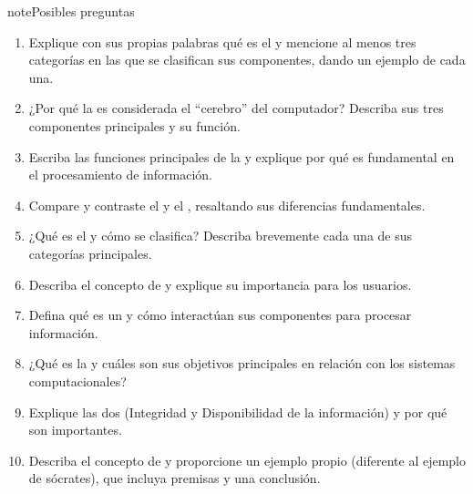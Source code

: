 \documentclass[letterpaper,10pt,spanish]{sphinxmanual}
\begin{document}
\begin{sphinxadmonition}{note}{Posibles preguntas}
\begin{enumerate}
%
\item {} 
\sphinxAtStartPar
Explique con sus propias palabras qué es el  y mencione al menos tres categorías en las que se clasifican sus componentes, dando un ejemplo de cada una.

\item {} 
\sphinxAtStartPar
¿Por qué la  es considerada el “cerebro” del computador? Describa sus tres componentes principales y su función.

\item {} 
\sphinxAtStartPar
Escriba las funciones principales de la  y explique por qué es fundamental en el procesamiento de información.

\item {} 
\sphinxAtStartPar
Compare y contraste el  y el , resaltando sus diferencias fundamentales.

\item {} 
\sphinxAtStartPar
¿Qué es el  y cómo se clasifica? Describa brevemente cada una de sus categorías principales.

\item {} 
\sphinxAtStartPar
Describa el concepto de  y explique su importancia para los usuarios.

\item {} 
\sphinxAtStartPar
Defina qué es un  y cómo interactúan sus componentes para procesar información.

\item {} 
\sphinxAtStartPar
¿Qué es la  y cuáles son sus objetivos principales en relación con los sistemas computacionales?

\item {} 
\sphinxAtStartPar
Explique las dos  (Integridad y Disponibilidad de la información) y por qué son importantes.

\item {} 
\sphinxAtStartPar
Describa el concepto de  y proporcione un ejemplo propio (diferente al ejemplo de sócrates), que incluya premisas y una conclusión.


\end{enumerate}
\end{sphinxadmonition}
\end{document}
